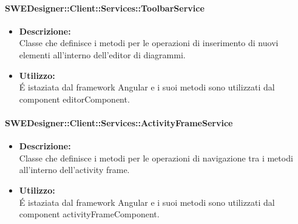           	\paragraph{SWEDesigner::Client::Services::ToolbarService}
				\begin{itemize}
          			\item \textbf{Descrizione:}\\
          			Classe che definisce i metodi per le operazioni di inserimento di nuovi elementi all’interno dell’editor di diagrammi.
          			\item \textbf{Utilizzo:}\\
          			É istaziata dal framework Angular e i suoi metodi sono utilizzati dal component editorComponent.
          		\end{itemize}
          	\paragraph{SWEDesigner::Client::Services::ActivityFrameService}
				\begin{itemize}
          			\item \textbf{Descrizione:}\\
          			Classe che definisce i metodi per le operazioni di navigazione tra i metodi all’interno dell’activity frame.
          			\item \textbf{Utilizzo:}\\
          			É istaziata dal framework Angular e i suoi metodi sono utilizzati dal component activityFrameComponent.
          		\end{itemize}
